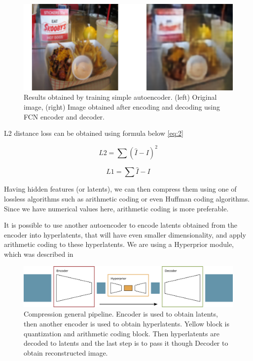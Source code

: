 \begin{figure}[!ht]
    \centering
    \includegraphics[width=\textwidth]{figure/autoencoder-result.png}
    \caption{Results obtained by training simple autoencoder. (left) Original image, (right) Image obtained after encoding and decoding  using FCN encoder and decoder.}
    \label{autoencoder-result}
\end{figure}

L2 distance loss can be obtained using formula below \ref{eq:2}

\begin{equation}
    \label{eq:2}
    L2=\sum (\hat{I}-I)^2
\end{equation}

\begin{equation}
    \label{eq:1}
    L1=\sum \hat{I}-I
\end{equation}

Having hidden features (or latents), we can then compress them using one of lossless algorithms such as arithmetic coding or even Huffman coding algorithms. Since we have numerical values here, arithmetic coding is more preferable.

It is possible to use another autoencoder to encode latents obtained from the encoder into hyperlatents, that will have even smaller dimensionality, and apply arithmetic coding to these hyperlatents. We are using a Hyperprior module, which was described in \cite{balle_variational_2018}

\begin{figure}[!ht]
    \centering
    \includegraphics[width=\textwidth]{figure/general.png}
    \caption{Compression general pipeline. Encoder is used to obtain latents, then another encoder is used to obtain hyperlatents. Yellow block is quantization and arithmetic coding block. Then hyperlatents are decoded to latents and the last step is to pass it though Decoder to obtain reconstructed image.}
    \label{whole-system-geneal-pipeline}
\end{figure}


